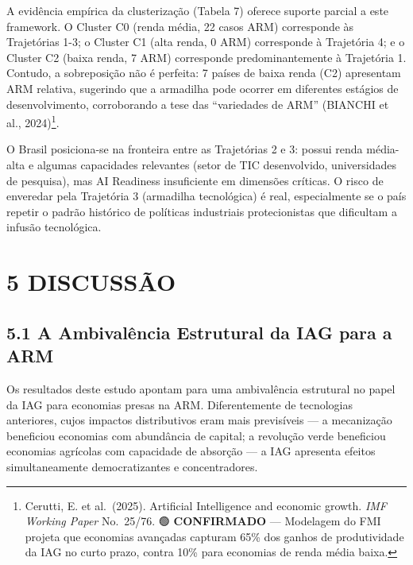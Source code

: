 \documentclass[
  brazilian,
  12pt,
]{article}
\begin{document}
A evidência empírica da clusterização (Tabela 7) oferece suporte parcial a este framework. O Cluster C0 (renda média, 22 casos ARM) corresponde às Trajetórias 1-3; o Cluster C1 (alta renda, 0 ARM) corresponde à Trajetória 4; e o Cluster C2 (baixa renda, 7 ARM) corresponde predominantemente à Trajetória 1. Contudo, a sobreposição não é perfeita: 7 países de baixa renda (C2) apresentam ARM relativa, sugerindo que a armadilha pode ocorrer em diferentes estágios de desenvolvimento, corroborando a tese das ``variedades de ARM'' (BIANCHI et al., 2024)\footnote{Cerutti, E. et al.~(2025). Artificial Intelligence and economic growth. \emph{IMF Working Paper} No.~25/76. 🟢 \textbf{CONFIRMADO} --- Modelagem do FMI projeta que economias avançadas capturam 65\% dos ganhos de produtividade da IAG no curto prazo, contra 10\% para economias de renda média baixa.}.

O Brasil posiciona-se na fronteira entre as Trajetórias 2 e 3: possui renda média-alta e algumas capacidades relevantes (setor de TIC desenvolvido, universidades de pesquisa), mas AI Readiness insuficiente em dimensões críticas. O risco de enveredar pela Trajetória 3 (armadilha tecnológica) é real, especialmente se o país repetir o padrão histórico de políticas industriais protecionistas que dificultam a infusão tecnológica.

\newpage

\section{5 DISCUSSÃO}\label{discussuxe3o}

\subsection{5.1 A Ambivalência Estrutural da IAG para a ARM}\label{a-ambivaluxeancia-estrutural-da-iag-para-a-arm}

Os resultados deste estudo apontam para uma ambivalência estrutural no papel da IAG para economias presas na ARM. Diferentemente de tecnologias anteriores, cujos impactos distributivos eram mais previsíveis --- a mecanização beneficiou economias com abundância de capital; a revolução verde beneficiou economias agrícolas com capacidade de absorção --- a IAG apresenta efeitos simultaneamente democratizantes e concentradores.
\end{document}

